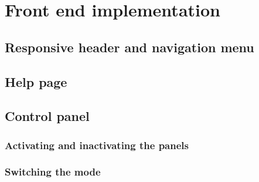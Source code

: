 \chapter{Front end implementation}
\label{ch:front_end_implementation}





\section{Responsive header and navigation menu}
\label{sec:responsive_header_and_navigation_menu}





\section{Help page}
\label{sec:help_page}





\section{Control panel}
\label{sec:control_panel}



\subsection{Activating and inactivating the panels}
\label{subsec:activating_and_inactivating_the_panels}



\subsection{Switching the mode}
\label{subsec:switching_the_mode}



